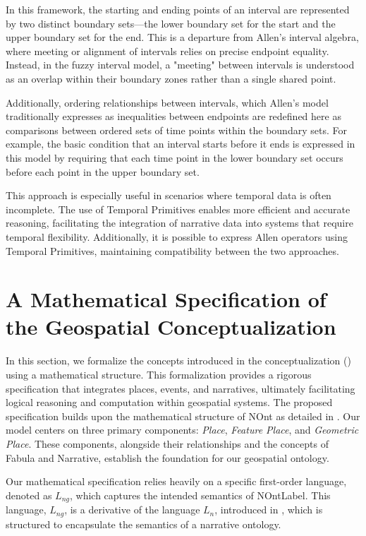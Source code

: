 In this framework, the starting and ending points of an interval are represented by two distinct boundary sets—the lower boundary set for the start and the upper boundary set for the end. This is a departure from Allen’s interval algebra, where meeting or alignment of intervals relies on precise endpoint equality. Instead, in the fuzzy interval model, a "meeting" between intervals is understood as an overlap within their boundary zones rather than a single shared point.

Additionally, ordering relationships between intervals, which Allen’s model traditionally expresses as inequalities between endpoints are redefined here as comparisons between ordered sets of time points within the boundary sets. For example, the basic condition that an interval starts before it ends is expressed in this model by requiring that each time point in the lower boundary set occurs before each point in the upper boundary set.

This approach is especially useful in scenarios where temporal data is often incomplete. The use of Temporal Primitives enables more efficient and accurate reasoning, facilitating the integration of narrative data into systems that require temporal flexibility. Additionally, it is possible to express Allen operators using Temporal Primitives, maintaining compatibility between the two approaches.

\section{A Mathematical Specification of the Geospatial Conceptualization}\label{V-sec:mathematicalSpecification}

In this section, we formalize the concepts introduced in the conceptualization () using a mathematical structure. This formalization provides a rigorous specification that integrates places, events, and narratives, ultimately facilitating logical reasoning and computation within geospatial systems. The proposed specification builds upon the mathematical structure of NOnt as detailed in \cite{meghiniRepresentingNarrativesDigital2021}. Our model centers on three primary components: \textit{Place}, \textit{Feature Place}, and \textit{Geometric Place}. These components, alongside their relationships and the concepts of Fabula and Narrative, establish the foundation for our geospatial ontology.

Our mathematical specification relies heavily on a specific first-order language, denoted as $L_{ng}$, which captures the intended semantics of \acrshort{NOntLabel}. This language, $L_{ng}$, is a derivative of the language $L_n$, introduced in \cite{meghiniRepresentingNarrativesDigital2021}, which is structured to encapsulate the semantics of a narrative ontology.

